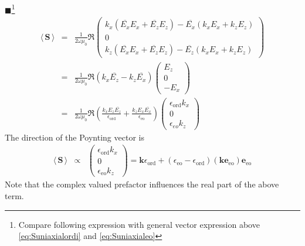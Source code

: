 \documentclass[12pt,a4paper,twoside,openright,BCOR10mm,headsepline,titlepage,abstracton,chapterprefix,final]{scrreprt}
\newcommand\Vector[1]{{\mathbf{#1}}}
\newcommand\vacuum{0}
\newcommand\wavenumber{k}
\newcommand\Wavevector{\Vector{\wavenumber}}
\newcommand\scalarEfield{E}
\newcommand\vacuumpermeability{\mu_{\vacuum}}
\newcommand\scalarpermittivity{\epsilon}
\newcommand\ordi{\text{ord}}
\newcommand\eo{\text{eo}}
\newcommand{\timeavg}[1]{{\langle\,#1\,\rangle}}
\newcommand{\remark}[1]{{\color{red}$\blacksquare$}\footnote{{\color{red}#1}}}
\begin{document}
\remark{Compare following expression with general vector expression above \eqref{eq:Suniaxialordi} and \eqref{eq:Suniaxialeo}}
\begin{eqnarray}
 \timeavg{\Vector{S}}
 &=& \frac{1}{2 \omega \vacuumpermeability} \Re 
   \begin{pmatrix}
     \wavenumber_x (\overline{\scalarEfield_x} \scalarEfield_x + \overline{\scalarEfield_z} \scalarEfield_z) - \overline{\scalarEfield_x} (\wavenumber_x \scalarEfield_x + \wavenumber_z \scalarEfield_z )
     \\
     0
     \\
     \wavenumber_z (\overline{\scalarEfield_x} \scalarEfield_x + \overline{\scalarEfield_z} \scalarEfield_z) - \overline{\scalarEfield_z} (\wavenumber_x \scalarEfield_x + \wavenumber_z \scalarEfield_z )     
   \end{pmatrix}
  \\
 &=& \frac{1}{2 \omega \vacuumpermeability} \Re 
   ( \wavenumber_x \overline{\scalarEfield_z} - \wavenumber_z \overline{\scalarEfield_x})
   \begin{pmatrix}
     \scalarEfield_z 
     \\
     0
     \\
     - \scalarEfield_x 
   \end{pmatrix}
  \\
 &=& \frac{1}{2 \omega \vacuumpermeability} \Re 
   \left( \frac{\wavenumber_x \scalarEfield_z \overline{\scalarEfield_z}}{\scalarpermittivity_{\ordi}} + \frac{\wavenumber_z \scalarEfield_x \overline{\scalarEfield_x}}{\scalarpermittivity_{\eo}} \right)
   \begin{pmatrix}
     \scalarpermittivity_{\ordi} \wavenumber_x 
     \\
     0
     \\
     \scalarpermittivity_{eo} \wavenumber_z 
   \end{pmatrix}
\end{eqnarray}
The direction of the Poynting vector is
\begin{eqnarray}
 \timeavg{\Vector{S}}
 &\propto&
   \begin{pmatrix}
     \scalarpermittivity_{\ordi} \wavenumber_x 
     \\
     0
     \\
     \scalarpermittivity_{\eo} \wavenumber_z 
   \end{pmatrix}
   =
   \Wavevector \scalarpermittivity_{\ordi} + (\scalarpermittivity_{\eo} - \scalarpermittivity_{\ordi}) (\Wavevector \Vector{e}_{\eo}) \Vector{e}_{\eo}
\end{eqnarray}
Note that the complex valued prefactor influences the real part of the above term.
\end{document}
